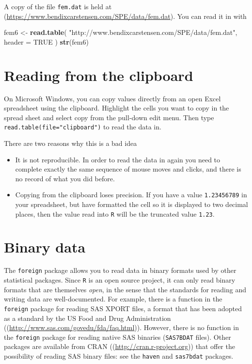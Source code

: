 \documentclass[
]{book}
\newenvironment{Shaded}{\begin{snugshade}}{\end{snugshade}}
\newcommand{\AttributeTok}[1]{\textcolor[rgb]{0.13,0.29,0.53}{#1}}
\newcommand{\ConstantTok}[1]{\textcolor[rgb]{0.56,0.35,0.01}{#1}}
\newcommand{\FunctionTok}[1]{\textcolor[rgb]{0.13,0.29,0.53}{\textbf{#1}}}
\newcommand{\NormalTok}[1]{#1}
\newcommand{\OtherTok}[1]{\textcolor[rgb]{0.56,0.35,0.01}{#1}}
\newcommand{\StringTok}[1]{\textcolor[rgb]{0.31,0.60,0.02}{#1}}
\providecommand{\tightlist}{%
  \setlength{\itemsep}{0pt}\setlength{\parskip}{0pt}}
\begin{document}
A copy of the file \texttt{fem.dat} is held at
(\url{https://www.bendixcarstensen.com/SPE/data/fem.dat}). You can
read it in with

\begin{Shaded}
\begin{Highlighting}[]
\NormalTok{fem6 }\OtherTok{\textless{}{-}} 
  \FunctionTok{read.table}\NormalTok{(}
    \StringTok{"http://www.bendixcarstensen.com/SPE/data/fem.dat"}\NormalTok{,}
    \AttributeTok{header =} \ConstantTok{TRUE}
\NormalTok{  )}
\FunctionTok{str}\NormalTok{(fem6)}
\end{Highlighting}
\end{Shaded}

\section{Reading from the clipboard}\label{reading-from-the-clipboard}

On Microsoft Windows, you can copy values directly from an open Excel
spreadsheet using the clipboard. Highlight the cells you want to copy
in the spread sheet and select copy from the pull-down edit menu. Then
type \texttt{read.table(file="clipboard")} to read the data in.

There are two reasons why this is a bad idea

\begin{itemize}
\tightlist
\item
  It is not reproducible. In order to read the data in again you
  need to complete exactly the same sequence of mouse moves and clicks,
  and there is no record of what you did before.
\item
  Copying from the clipboard loses precision. If you have a value
  \texttt{1.23456789} in your spreadsheet, but have formatted the cell so it
  is displayed to two decimal places, then the value read into
  \texttt{R} will be the truncated value \texttt{1.23}.
\end{itemize}

\section{Binary data}\label{binary-data}

The \texttt{foreign} package allows you to read data in binary formats
used by other statistical packages. Since \texttt{R} is an open source
project, it can only read binary formats that are themselves \emph{open},
in the sense that the standards for reading and writing data are
well-documented. For example, there is a function in the
\texttt{foreign} package for reading SAS XPORT files, a format that
has been adopted as a standard by the US Food and Drug Administration
((\url{http://www.sas.com/govedu/fda/faq.html})). However, there is no
function in the \texttt{foreign} package for reading native SAS
binaries (\texttt{SAS7BDAT} files). Other packages are available from
CRAN ((\url{http://cran.r-project.org})) that offer the possibility of
reading SAS binary files: see the \texttt{haven} and \texttt{sas7bdat}
packages.
\end{document}

